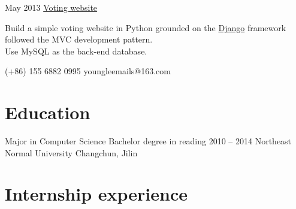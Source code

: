 \documentclass{tccv}
\begin{document}
\begin{eventlist}
\item{May 2013}
  {}
  {\href{https://github.com/YoungLeeNENU/a-vote-website}{Voting website}}

  Build a simple voting website in Python grounded on the \href{https://www.djangoproject.com/}{Django} framework
  followed the MVC development pattern.\\
  Use MySQL as the back-end database.


\end{eventlist}

{(+86) 155 6882 0995}
{youngleemails@163.com}


\section{Education}

\begin{yearlist}

\item[Major in Computer Science \newline
  Bachelor degree in reading]
  {2010 -- 2014}
  {Northeast Normal University}
  {Changchun, Jilin}

\end{yearlist}

\section{Internship experience}
\end{document}
